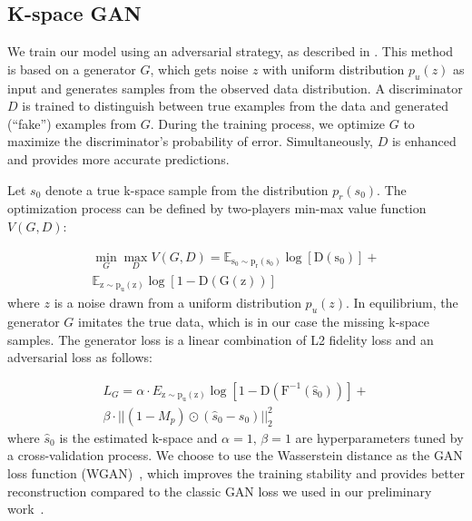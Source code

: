 \documentclass[10pt,journal,compsoc]{IEEEtran}
\begin{document}
\subsection{K-space GAN}
We train our model using an adversarial strategy, as described in \cite{goodfellow2014generative,radford2015unsupervised}. 
This method is based on a generator $G$, which gets noise \textbf{$z$ }with uniform distribution \textbf{$p_{u}\left(z\right)$} as input and generates samples from the observed data distribution. A discriminator $D$ is trained to distinguish between true examples from the data and generated (``fake'') examples from $G.$ During the training process, we optimize $G$ to maximize the discriminator's probability of error. Simultaneously, $D$ is enhanced and provides more accurate predictions.

Let $s_{0}$ denote a true k-space sample from the distribution $p_{r}\left(s_{0}\right)$. The optimization process can be defined by two-players min-max value function $V(G,D)$:

\begin{equation}
\begin{split}
\min_{G}\max_{D}V(G,D) = \mathbb{E_{\mathrm{s_{0}\sim p_{r}\left(s_{0}\right)}}\mathrm{\log\left[D\left(s_{0}\right)\right]}}+
\\
\mathbb{E_{\mathrm{z\sim p_{u}\left(z\right)}}\mathrm{\log\left[1-D\left(G(z)\right)\right]}}
\end{split}
\end{equation}
where $z$ is a noise drawn from a uniform distribution $p_{u}\left(z\right)$.
In equilibrium, the generator $G$ imitates the true data, which is in our case the missing k-space samples. The generator loss is a linear combination of L2 fidelity loss and an adversarial loss as follows:

\begin{equation}
\begin{aligned}L_{G}=\alpha\cdot E_{\mathrm{z\sim p_{u}\left(z\right)}}\mathrm{\log\left[1-D\left(F^{-1}\left(\hat{s}_{0}\right)\right)\right]}+\\
\beta\cdot||\left(1-M_{p}\right)\odot\left(\hat{s}_{0}-s_{0}\right)||_{2}^{2}
\end{aligned}
\end{equation}
where $\hat{s}_{0}$ is the estimated k-space and $\alpha=1,\,\beta=1$ are hyperparameters tuned by a cross-validation process.
We choose to use the Wasserstein distance as the GAN loss function (WGAN)~\cite{arjovsky2017wasserstein}, which improves the training stability and provides better reconstruction compared to the classic GAN loss we used in our preliminary work~\cite{shitrit2017accelerated}.
\end{document}
